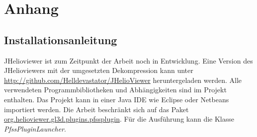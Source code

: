\section{Anhang}
\subsection{Installationsanleitung}
JHelioviewer ist zum Zeitpunkt der Arbeit noch in Entwicklung. Eine Version des JHelioviewers mit der umgesetzten Dekompression kann unter \url{http://github.com/Helldevastator/JHelioViewer} heruntergeladen werden. Alle verwendeten Programmbibliotheken und Abhängigkeiten sind im Projekt enthalten. Das Projekt kann in einer Java IDE wie Eclipse oder Netbeans importiert werden. Die Arbeit beschränkt sich auf das Paket \url{org.helioviewer.gl3d.plugins.pfssplugin}. Für die Ausführung kann die Klasse \textit{PfssPluginLauncher}.

